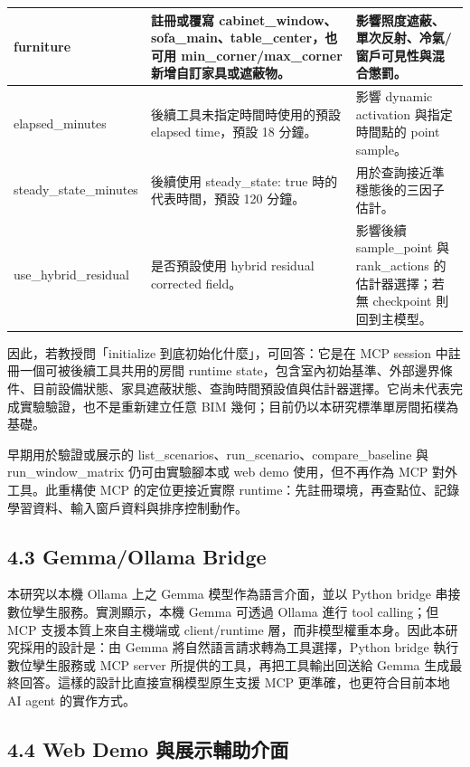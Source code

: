 \documentclass[12pt,a4paper]{article}
\begin{document}
\begin{table}[htbp]
\begin{tabular}{|>{\raggedright\arraybackslash}p{}|>{\raggedright\arraybackslash}p{}|>{\raggedright\arraybackslash}p{}|}
\hline
furniture & 註冊或覆寫 cabinet\_\allowbreak{}window、sofa\_\allowbreak{}main、table\_\allowbreak{}center，也可用 min\_\allowbreak{}corner/max\_\allowbreak{}corner 新增自訂家具或遮蔽物。 & 影響照度遮蔽、單次反射、冷氣/窗戶可見性與混合懲罰。 \\
\hline
elapsed\_\allowbreak{}minutes & 後續工具未指定時間時使用的預設 elapsed time，預設 18 分鐘。 & 影響 dynamic activation 與指定時間點的 point sample。 \\
\hline
steady\_\allowbreak{}state\_\allowbreak{}minutes & 後續使用 steady\_\allowbreak{}state: true 時的代表時間，預設 120 分鐘。 & 用於查詢接近準穩態後的三因子估計。 \\
\hline
use\_\allowbreak{}hybrid\_\allowbreak{}residual & 是否預設使用 hybrid residual corrected field。 & 影響後續 sample\_\allowbreak{}point 與 rank\_\allowbreak{}actions 的估計器選擇；若無 checkpoint 則回到主模型。 \\
\hline
\end{tabular}
\end{table}

因此，若教授問「initialize 到底初始化什麼」，可回答：它是在 MCP session 中註冊一個可被後續工具共用的房間 runtime state，包含室內初始基準、外部邊界條件、目前設備狀態、家具遮蔽狀態、查詢時間預設值與估計器選擇。它尚未代表完成實驗驗證，也不是重新建立任意 BIM 幾何；目前仍以本研究標準單房間拓樸為基礎。


早期用於驗證或展示的 list\_\allowbreak{}scenarios、run\_\allowbreak{}scenario、compare\_\allowbreak{}baseline 與 run\_\allowbreak{}window\_\allowbreak{}matrix 仍可由實驗腳本或 web demo 使用，但不再作為 MCP 對外工具。此重構使 MCP 的定位更接近實際 runtime：先註冊環境，再查點位、記錄學習資料、輸入窗戶資料與排序控制動作。


\subsection*{4.3 Gemma/Ollama Bridge}

本研究以本機 Ollama 上之 Gemma 模型作為語言介面，並以 Python bridge 串接數位孿生服務。實測顯示，本機 Gemma 可透過 Ollama 進行 tool calling；但 MCP 支援本質上來自主機端或 client/runtime 層，而非模型權重本身。因此本研究採用的設計是：由 Gemma 將自然語言請求轉為工具選擇，Python bridge 執行數位孿生服務或 MCP server 所提供的工具，再把工具輸出回送給 Gemma 生成最終回答。這樣的設計比直接宣稱模型原生支援 MCP 更準確，也更符合目前本地 AI agent 的實作方式。


\subsection*{4.4 Web Demo 與展示輔助介面}
\end{document}

